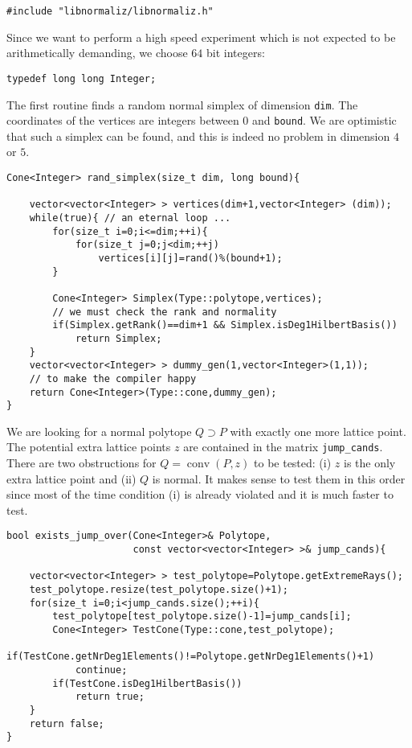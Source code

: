 \begin{small}
\begin{Verbatim}
#include "libnormaliz/libnormaliz.h"
\end{Verbatim}

Since we want to perform a high speed experiment which is not expected to be arithmetically demanding, we choose $64$ bit integers:
\begin{Verbatim}
typedef long long Integer;
\end{Verbatim}

The first routine finds a random normal simplex of dimension \verb|dim|. The coordinates of the vertices are integers between $0$ and \verb|bound|. We are optimistic that such a simplex can be found, and this is indeed no problem in dimension $4$ or $5$.

\begin{Verbatim}
Cone<Integer> rand_simplex(size_t dim, long bound){

    vector<vector<Integer> > vertices(dim+1,vector<Integer> (dim));
    while(true){ // an eternal loop ...
        for(size_t i=0;i<=dim;++i){
            for(size_t j=0;j<dim;++j)
                vertices[i][j]=rand()%(bound+1);
        }

        Cone<Integer> Simplex(Type::polytope,vertices);
        // we must check the rank and normality
        if(Simplex.getRank()==dim+1 && Simplex.isDeg1HilbertBasis())
            return Simplex;
    }
    vector<vector<Integer> > dummy_gen(1,vector<Integer>(1,1)); 
    // to make the compiler happy
    return Cone<Integer>(Type::cone,dummy_gen); 
}
\end{Verbatim}

We are looking for a normal polytope $Q\supset P$ with exactly one more lattice point. The potential extra lattice points $z$ are contained in the matrix \verb|jump_cands|. There are two obstructions for $Q=\operatorname{conv}(P,z)$ to be tested: (i) $z$ is the only extra lattice point and (ii) $Q$ is normal. It makes sense to test them in this order since most of the time condition (i) is already violated and it is much faster to test.
\begin{Verbatim}
bool exists_jump_over(Cone<Integer>& Polytope, 
                      const vector<vector<Integer> >& jump_cands){

    vector<vector<Integer> > test_polytope=Polytope.getExtremeRays();
    test_polytope.resize(test_polytope.size()+1); 
    for(size_t i=0;i<jump_cands.size();++i){
        test_polytope[test_polytope.size()-1]=jump_cands[i];
        Cone<Integer> TestCone(Type::cone,test_polytope);
        if(TestCone.getNrDeg1Elements()!=Polytope.getNrDeg1Elements()+1)
            continue;
        if(TestCone.isDeg1HilbertBasis())
            return true;
    }
    return false;
}
\end{Verbatim}


\end{small}

